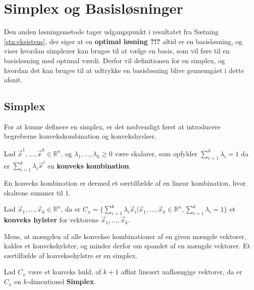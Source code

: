 \section{Simplex og Basisløsninger}
Den anden løsningsmetode tager udgangspunkt i resultatet fra Sætning \ref{stn:eksistens}, der siger at en \textbf{optimal løsning ?!?} altid er en basisløsning, og viser hvordan simplexer kan bruges til at vælge en basis, som vil føre til en basisløsning med optimal værdi.
Derfor vil definitionen for en simplex, og hvordan det kan bruges til at udtrykke en basisløsning blive gennemgået i dette afsnit.
\subsection{Simplex}
For at kunne definere en simplex, er det nødvendigt først at introducere begreberne konvekskombination og konvekshyslser.
\begin{defn}
Lad $\vec{x}^1, ...,\vec{x}^k \in \mathds{R}^n$, og $\lambda_1,..., \lambda_k \geq 0 $ være skalarer, som opfylder $\sum_{i=1}^k \lambda_i =1$ da er $\sum_{i=1}^k \lambda_i \vec{x}^i$ en \textbf{konveks kombination}.
\label{def:KonveksKombination}
\end{defn}
En konveks kombination er dermed et særtilfælde af en linear kombination, hvor skalrene summer til $1$.
\begin{defn}
Lad $\vec{x}_1, ...,\vec{x}_k \in \mathds{R}^n$, da er $C_{x} = \{\sum_{i=1}^k \lambda_i \vec{x}_i| \vec{x}_1, ...,\vec{x}_k \in \mathds{R}^n, \sum_{i=1}^k \lambda_i =1\}$ et \textbf{konveks hylster} for vektorene $\vec{x}_1, ...,\vec{x}_k$. 
\label{def:Konvekshuld}
\end{defn}
Mens, at mængden af alle konvekse kombinationer af en given mængde vektorer, kaldes et konvekshylster, og minder derfor om spandet af en mængde vektorer.
Et særtilfælde af konveksehylstre er en simplex.
\begin{defn}[Simplex]
Lad $C_x$ være et konveks huld, af $k+1$ affint lineært uafhængige vektorer, da er $C_x$ en $k$-dimentionel \textbf{Simplex}.
\label{def:simplex}
\end{defn}
